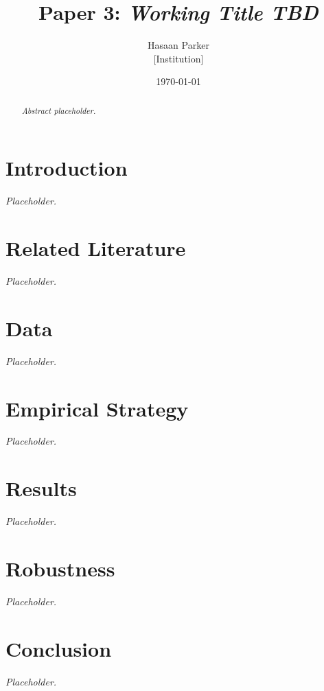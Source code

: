 \documentclass[12pt]{article}
\title{Paper 3: \textit{Working Title TBD}}
\author{Hasaan Parker \\ \small{[Institution]}}
\date{\today}
\begin{document}
\maketitle

\begin{abstract}
\noindent
\textit{Abstract placeholder.}
\end{abstract}

\section{Introduction}
\textit{Placeholder.}

\section{Related Literature}
\textit{Placeholder.}

\section{Data}
\textit{Placeholder.}

\section{Empirical Strategy}
\textit{Placeholder.}

\section{Results}
\textit{Placeholder.}

\section{Robustness}
\textit{Placeholder.}

\section{Conclusion}
\textit{Placeholder.}



\end{document}
